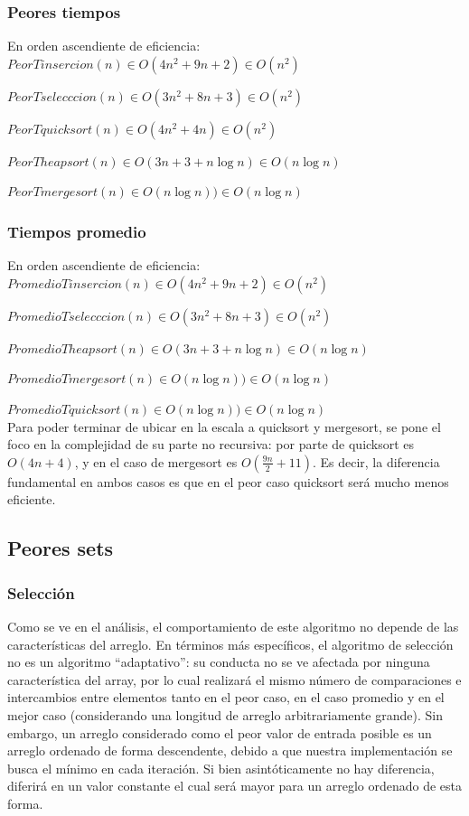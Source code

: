 \documentclass[article,a4paper]{article}
\begin{document}
\subsubsection{Peores tiempos}

En orden ascendiente de eficiencia:\\

$PeorTinsercion(n) \in O(4n^2 + 9n + 2) \in O(n^2)$

$PeorTselecccion(n) \in O(3n^2 + 8n + 3) \in O(n^2)$ 

$PeorTquicksort(n) \in O(4n^2 + 4n) \in O(n^2)$

$PeorTheapsort(n)  \in O(3n + 3 +n \log n) \in O(n \log n)$

$PeorTmergesort(n) \in O(n \log n)) \in O(n \log n)$

\subsubsection{Tiempos promedio}

En orden ascendiente de eficiencia:\\

$PromedioTinsercion(n) \in O(4n^2 + 9n + 2) \in O(n^2)$

$PromedioTselecccion(n)  \in O(3n^2 + 8n + 3) \in O(n^2)$

$PromedioTheapsort(n) \in O(3n + 3 +n \log n) \in O(n \log n)$ 

$PromedioTmergesort(n) \in O(n \log n)) \in O(n \log n)$

$PromedioTquicksort(n) \in O(n \log n)) \in O(n \log n)$\\

Para poder terminar de ubicar en la escala a quicksort y mergesort, se pone el foco en la complejidad de su parte no recursiva: por parte de quicksort es $O(4n + 4)$, y en el caso de mergesort es $O( \frac{9n}{2} +11 )$. Es decir, la diferencia fundamental en ambos casos es que en el peor caso quicksort será mucho menos eficiente.

\subsection{Peores sets}

\subsubsection{Selección}

Como se ve en el análisis, el comportamiento de este algoritmo no depende de las características del arreglo. En términos más específicos, el algoritmo de selección no es un algoritmo “adaptativo”: su conducta no se ve afectada por ninguna característica del array, por lo cual realizará el mismo número de comparaciones e intercambios entre elementos tanto en el peor caso, en el caso promedio y en el mejor caso (considerando una longitud de arreglo arbitrariamente grande). Sin embargo, un arreglo considerado como el peor valor de entrada posible es un arreglo ordenado de forma descendente, debido a que nuestra implementación se busca el mínimo en cada iteración. Si bien asintóticamente no hay diferencia, diferirá en un valor constante el cual será mayor para un arreglo ordenado de esta forma.
\end{document}

